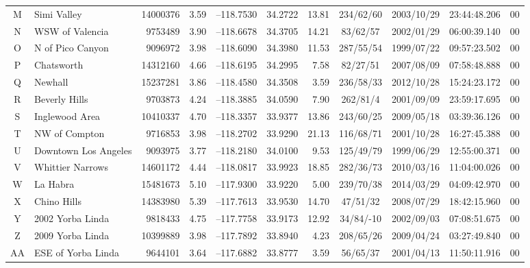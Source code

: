 \begin{table*}
\begin{tabular}[t]{@{} c l r c r@{, }l r c c c r}
		M	& Simi Valley			&	14000376	&	3.59	&	--118.7530	&	34.2722	&	13.81	&	234/62/60	&	2003/10/29	&	23:44:48.206	&	00	\\ %
		N	& WSW of Valencia		&	 9753489	&	3.90	&	--118.6678	&	34.3705	&	14.21	&	 83/62/57	&	2002/01/29	&	06:00:39.140	&	00	\\ %
		O	& N of Pico Canyon		&	 9096972	&	3.98	&	--118.6090	&	34.3980	&	11.53	&	287/55/54	&	1999/07/22	&	09:57:23.502	&	00	\\ %
		P	& Chatsworth			&	14312160	&	4.66	&	--118.6195	&	34.2995	&	 7.58	&	 82/27/51	&	2007/08/09	&	07:58:48.888	&	00	\\ %
		Q	& Newhall				&	15237281	&	3.86	&	--118.4580	&	34.3508	&	 3.59	&	236/58/33	&	2012/10/28	&	15:24:23.172	&	00	\\ %
																					
		R	& Beverly Hills			&	 9703873	&	4.24	&	--118.3885	&	34.0590	&	 7.90	&	262/81/4	&	2001/09/09	&	23:59:17.695	&	00	\\ %
		S	& Inglewood Area		&	10410337	&	4.70	&	--118.3357	&	33.9377	&	13.86	&	243/60/25	&	2009/05/18	&	03:39:36.126	&	00	\\ %
		T	& NW of Compton			&	 9716853	&	3.98	&	--118.2702	&	33.9290	&	21.13	&	116/68/71	&	2001/10/28	&	16:27:45.388	&	00	\\ %
																					
		U	& Downtown Los Angeles	&	 9093975	&	3.77	&	--118.2180	&	34.0100	&	 9.53	&	125/49/79	&	1999/06/29	&	12:55:00.371	&	00	\\ %
																					
		V	& Whittier Narrows		&	14601172	&	4.44	&	--118.0817	&	33.9923	&	18.85	&	282/36/73	&	2010/03/16	&	11:04:00.026	&	00	\\ %
		W	& La Habra				&	15481673	&	5.10	&	--117.9300	&	33.9220	&	 5.00	&	239/70/38	&	2014/03/29	&	04:09:42.970	&	00	\\ %
		X	& Chino Hills			&	14383980	&	5.39	&	--117.7613	&	33.9530	&	14.70	&	 47/51/32	&	2008/07/29	&	18:42:15.960	&	00	\\ %
		Y	& 2002 Yorba Linda		&	 9818433	&	4.75	&	--117.7758	&	33.9173	&	12.92	&	 34/84/-10	&	2002/09/03	&	07:08:51.675	&	00	\\ %
		Z	& 2009 Yorba Linda		&	10399889	&	3.98	&	--117.7892	&	33.8940	&	 4.23	&	208/65/26	&	2009/04/24	&	03:27:49.840	&	00	\\ %
		AA	& ESE of Yorba Linda	&	 9644101	&	3.64	&	--117.6882	&	33.8777	&	 3.59	&	 56/65/37	&	2001/04/13	&	11:50:11.916	&	00	\\ %
																					

\end{tabular}
\end{table*}
